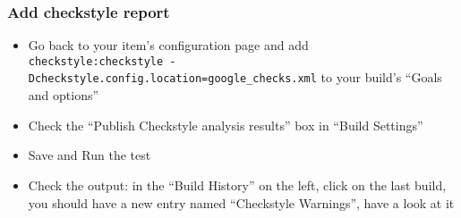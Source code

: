 \documentclass{article}
\begin{document}
\subsubsection{Add checkstyle report}
\begin{itemize}
\item Go back to your item's configuration page and add \\
\texttt{checkstyle:checkstyle -Dcheckstyle.config.location=google\_checks.xml} to your build's ``Goals and options''
\item Check the ``Publish Checkstyle analysis results'' box in ``Build Settings''
\item Save and Run the test
\item Check the output: in the ``Build History'' on the left, click on the last build, you should have a new entry named ``Checkstyle Warnings'', have a look at it
\end{itemize}

\clearpage
\end{document}
